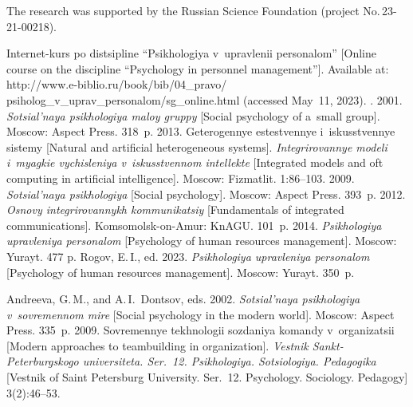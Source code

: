 \vspace*{-11pt}

\Ack
   \noindent
   The research was supported by the Russian Science Foundation (project No.\,23-21-00218).
  


  \begin{multicols}{2}

\renewcommand{\bibname}{\protect\rmfamily References}

{\small\frenchspacing
 {%
 \begin{thebibliography}{99} 
    Internet-kurs po dis\-tsip\-li\-ne ``Psi\-kho\-lo\-giya v~uprav\-le\-nii per\-so\-na\-lom'' 
[Online course on the discipline ``Psychology in personnel management'']. Available at: {\sf 
http://www.e-biblio.ru/book/bib/04\_pravo/ psiholog\_v\_uprav\_personalom/sg\_online.html} (accessed 
May~11, 2023).
   . 2001. \textit{So\-tsi\-al'\-naya psi\-kho\-lo\-giya 
ma\-loy grup\-py} [Social psychology of a~small group]. Moscow: 
Aspect Press. 318~p.
    2013. Ge\-te\-ro\-gen\-nye es\-test\-ven\-nye i~is\-kus\-stven\-nye sis\-te\-my [Natural 
and artificial heterogeneous systems]. \textit{In\-teg\-ri\-ro\-van\-nye mo\-de\-li i~myag\-kie vy\-chis\-le\-niya 
v~iskusstvennom intellekte} [Integrated models and oft computing in artificial intelligence]. 
Moscow: Fizmatlit. 1:86--103.
    2009. \textit{So\-tsi\-al'\-naya psi\-kho\-lo\-giya} [Social psychology]. Moscow: 
Aspect Press. 393~p.
 2012. \textit{Os\-no\-vy in\-teg\-ri\-ro\-van\-nykh kom\-mu\-ni\-ka\-tsiy} 
[Fundamentals of integrated communications]. Komsomolsk-on-Amur: 
KnAGU. 101~p.
 2014. 
\textit{Psi\-kho\-lo\-giya uprav\-le\-niya per\-so\-na\-lom} 
[Psychology of human resources management]. 
Moscow: Yurayt. 477 p.
   Rogov, E.\,I., ed.  2023. \textit{Psi\-kho\-lo\-giya uprav\-le\-niya per\-so\-na\-lom} 
   [Psychology of human resources management]. Moscow: 
Yurayt. 350~p.


   Andreeva, G.\,M., and A.\,I.~Dontsov, eds. 2002. \textit{So\-tsi\-al'\-naya psi\-kho\-lo\-giya 
v~so\-vre\-men\-nom mi\-re} [Social psychology in the modern world]. Moscow: Aspect Press. 335~p.
    2009. So\-vre\-men\-nye tekh\-no\-lo\-gii so\-zda\-niya ko\-man\-dy v~or\-ga\-ni\-za\-tsii 
[Modern approaches to teambuilding in organization]. \textit{Vestnik Sankt-Peterburgskogo 
universiteta. Ser.~12. Psikhologiya. Sotsiologiya. Pedagogika} [Vestnik of Saint Petersburg University. Ser.~12.
Psychology. Sociology. Pedagogy] 3(2):46--53.


\end{thebibliography}}}
\end{multicols}
